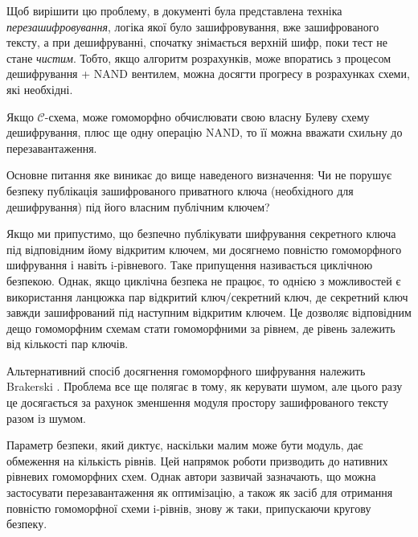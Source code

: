 Щоб вирішити цю проблему, в документі була представлена техніка \emph{перезашифровування},
логіка якої було зашифровування, вже зашифрованого тексту, а при дешифруванні, спочатку
знімається верхній шифр, поки тест не стане \emph{чистим}. Тобто, якщо алгоритм 
розрахунків, може впоратись з процесом дешифрування + \textsc{NAND} вентилем, можна
досягти прогресу в розрахунках схеми, які необхідні.

\begin{definition}
    \label{def:bootstraping}
    Якщо \(\mathcal{C}\)-схема, може гомоморфно обчислювати свою власну Булеву схему
    дешифрування, плюс ще одну операцію \textsc{NAND}, то її можна вважати схильну до
    перезавантаження.
\end{definition}

Основне питання яке виникає до вище наведеного визначення: Чи не порушує безпеку публікація
зашифрованого приватного ключа (необхідного для дешифрування) під його власним публічним
ключем?

Якщо ми припустимо, що безпечно публікувати шифрування секретного ключа під відповідним
йому відкритим ключем, ми досягнемо повністю гомоморфного шифрування і навіть i-рівневого.
Таке припущення називається циклічною безпекою. Однак, якщо циклічна безпека не працює,
то однією з можливостей є використання ланцюжка пар відкритий ключ/секретний ключ, де
секретний ключ завжди зашифрований під наступним відкритим ключем. Це дозволяє відповідним
дещо гомоморфним схемам стати гомоморфними за рівнем, де рівень залежить від кількості пар
ключів.

Альтернативний спосіб досягнення гомоморфного шифрування належить Brakerski
\cite{cryptoeprint:2011/344}. Проблема все ще полягає в тому, як керувати шумом, але цього
разу це досягається за рахунок зменшення модуля простору зашифрованого тексту разом із
шумом.

Параметр безпеки, який диктує, наскільки малим може бути модуль, дає обмеження на кількість
рівнів. Цей напрямок роботи призводить до нативних рівневих гомоморфних схем. Однак автори
зазвичай зазначають, що можна застосувати перезавантаження як оптимізацію, а також як засіб
для отримання повністю гомоморфної схеми i-рівнів, знову ж таки, припускаючи кругову
безпеку.
